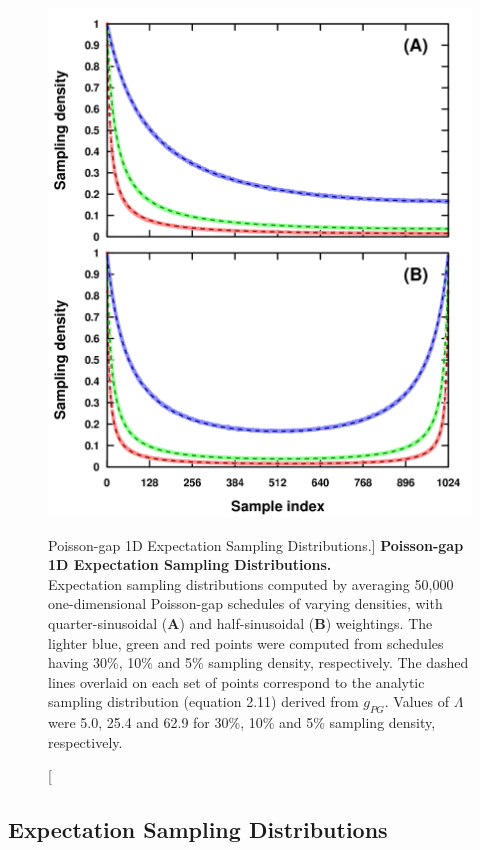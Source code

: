 \begin{figure}[ht!]
\begin{center}
  \includegraphics[width=5in]{figs/dgs/02-expect-1d.png}
\end{center}
\caption
      [Poisson-gap 1D Expectation Sampling Distributions.]{
  {\bf Poisson-gap 1D Expectation Sampling Distributions.}
  \\
  Expectation sampling distributions computed by averaging 50,000
  one-dimensional Poisson-gap schedules of varying densities, with
  quarter-sinusoidal ({\bf A}) and half-sinusoidal ({\bf B}) weightings.
  The lighter blue, green and red points were computed from schedules having
  30\%, 10\% and 5\% sampling density, respectively. The dashed lines overlaid
  on each set of points correspond to the analytic sampling distribution
  (equation 2.11) derived from $g_{PG}$. Values of $\Lambda$ were 5.0, 25.4
  and 62.9 for 30\%, 10\% and 5\% sampling density, respectively.
}
\label{figure.2.2}
\end{figure}

\subsection{Expectation Sampling Distributions}

